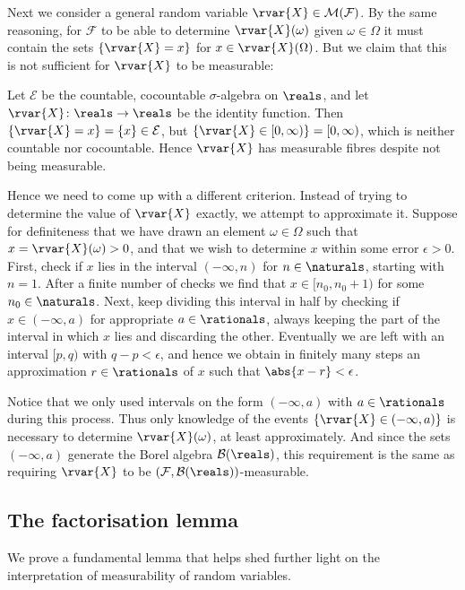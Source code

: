 \documentclass[article, a4paper, 11pt, oneside]{memoir}
\numberwithin{equation}{chapter}
\newcommand{\calB}{\mathcal{B}}
\newcommand{\calE}{\mathcal{E}}
\newcommand{\calF}{\mathcal{F}}
\newcommand{\borel}[1]{\calB(#1)}
\begin{document}
Next we consider a general random variable $\rvar{X} \in \meas{\calF}$. By the same reasoning, for $\calF$ to be able to determine $\rvar{X}(\omega)$ given $\omega \in \Omega$ it must contain the sets $\{\rvar{X} = x\}$ for $x \in \rvar{X}(\Omega)$. But we claim that this is not sufficient for $\rvar{X}$ to be measurable:
%
\begin{example}
    Let $\calE$ be the countable, cocountable $\sigma$-algebra on $\reals$, and let $\rvar{X} \colon \reals \to \reals$ be the identity function. Then $\{\rvar{X} = x\} = \{x\} \in \calE$, but $\{\rvar{X} \in [0,\infty)\} = [0, \infty)$, which is neither countable nor cocountable. Hence $\rvar{X}$ has measurable fibres despite not being measurable.
\end{example}
%
Hence we need to come up with a different criterion. Instead of trying to determine the value of $\rvar{X}$ exactly, we attempt to approximate it. Suppose for definiteness that we have drawn an element $\omega \in \Omega$ such that $x = \rvar{X}(\omega) > 0$, and that we wish to determine $x$ within some error $\epsilon > 0$. First, check if $x$ lies in the interval $(-\infty,n)$ for $n \in \naturals$, starting with $n = 1$. After a finite number of checks we find that $x \in [n_0, n_0+1)$ for some $n_0 \in \naturals$. Next, keep dividing this interval in half by checking if $x \in (-\infty, a)$ for appropriate $a \in \rationals$, always keeping the part of the interval in which $x$ lies and discarding the other. Eventually we are left with an interval $[p,q)$ with $q-p < \epsilon$, and hence we obtain in finitely many steps an approximation $r \in \rationals$ of $x$ such that $\abs{x-r} < \epsilon$.

Notice that we only used intervals on the form $(-\infty, a)$ with $a \in \rationals$ during this process. Thus only knowledge of the events $\{\rvar{X} \in (-\infty, a)\}$ is necessary to determine $\rvar{X}(\omega)$, at least approximately. And since the sets $(-\infty, a)$ generate the Borel algebra $\borel{\reals}$, this requirement is the same as requiring $\rvar{X}$ to be $(\calF,\borel{\reals})$-measurable.


\subsection{The factorisation lemma}

We prove a fundamental lemma that helps shed further light on the interpretation of measurability of random variables.
\end{document}
